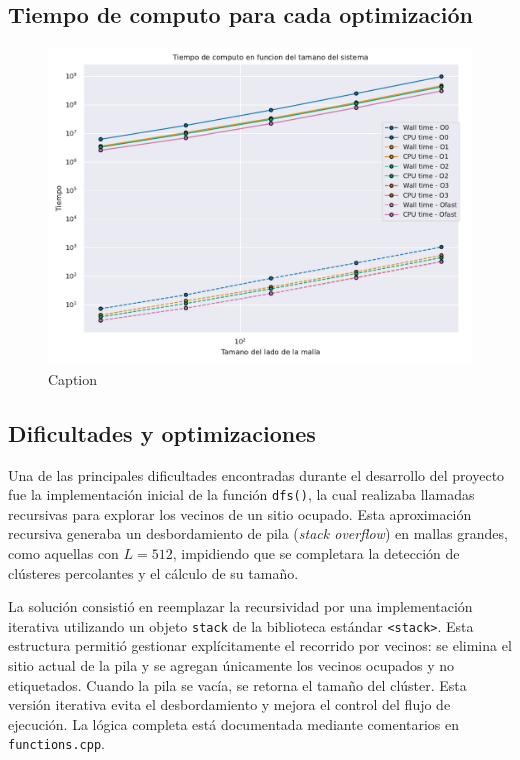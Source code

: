 \documentclass[%
 reprint,
 amsmath,amssymb,
 aps,
]{revtex4-2}
\begin{document}
\subsection{Tiempo de computo para cada optimización}

\begin{figure}[H]
    \centering
    \includegraphics[width=1\linewidth]{Tiempos.pdf}
    \caption{Caption}
    \label{fig:enter-label}
\end{figure}

\subsection{Dificultades y optimizaciones}

Una de las principales dificultades encontradas durante el desarrollo del proyecto fue la implementación inicial de la función \texttt{dfs()}, la cual realizaba llamadas recursivas para explorar los vecinos de un sitio ocupado. Esta aproximación recursiva generaba un desbordamiento de pila (\textit{stack overflow}) en mallas grandes, como aquellas con \( L = 512 \), impidiendo que se completara la detección de clústeres percolantes y el cálculo de su tamaño.

La solución consistió en reemplazar la recursividad por una implementación iterativa utilizando un objeto \texttt{stack} de la biblioteca estándar \texttt{<stack>}. Esta estructura permitió gestionar explícitamente el recorrido por vecinos: se elimina el sitio actual de la pila y se agregan únicamente los vecinos ocupados y no etiquetados. Cuando la pila se vacía, se retorna el tamaño del clúster. Esta versión iterativa evita el desbordamiento y mejora el control del flujo de ejecución. La lógica completa está documentada mediante comentarios en \texttt{functions.cpp}.
\end{document}
